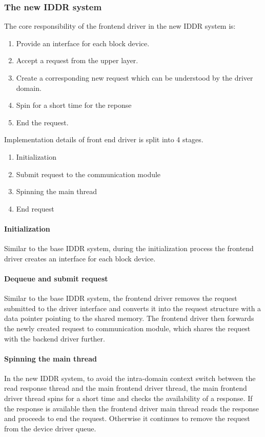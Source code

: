 \subsubsection*{The new IDDR system}
The core responsibility of the frontend driver in the new IDDR system is:
\begin{enumerate}
\item Provide an interface for each block device.
\item Accept a request from the upper layer.
\item Create a corresponding new request which can be understood by the driver domain.
\item Spin for a short time for the reponse
\item End the request.
\end{enumerate}

Implementation details of front end driver is split into 4 stages. 
\begin{enumerate}
\item Initialization
\item Submit request to the communication module
\item Spinning the main thread
\item End request
\end{enumerate}

\paragraph{Initialization}
Similar to the base IDDR system, during the initialization process the frontend driver creates an interface for each block device.

\paragraph{Dequeue and submit request}
Similar to the base IDDR system, the frontend driver removes the request submitted to the driver interface and converts it into the request structure with a data pointer pointing to the shared memory. The frontend driver then forwards the newly created request to communication module, which shares the request with the backend driver further.

\paragraph{Spinning the main thread}
In the new IDDR system, to avoid the intra-domain context switch between the read response thread and the main frontend driver thread, the main frontend driver thread spins for a short time and checks the availability of a response. If the response is available then the frontend driver main thread reads the response and proceeds to end the request. Otherwise it continues to remove the request from the device driver queue.

